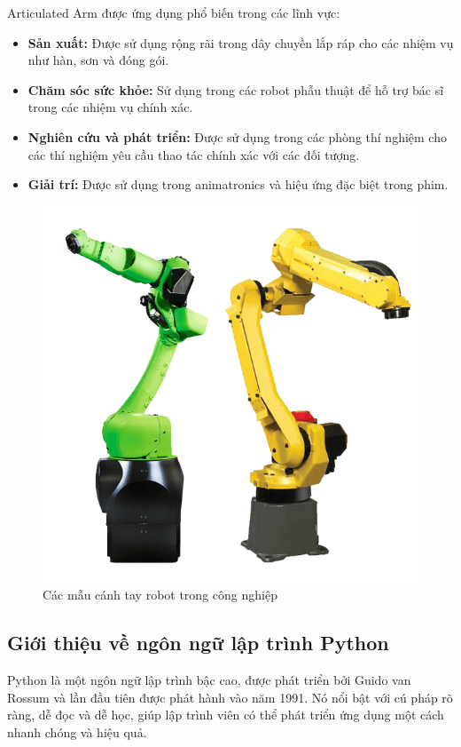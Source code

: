 Articulated Arm được ứng dụng phổ biến trong các lĩnh vực:
\begin{itemize}
    \item \textbf{Sản xuất:} Được sử dụng rộng rãi trong dây chuyền lắp ráp cho các nhiệm vụ như hàn, sơn và đóng gói.
    \item \textbf{Chăm sóc sức khỏe:} Sử dụng trong các robot phẫu thuật để hỗ trợ bác sĩ trong các nhiệm vụ chính xác.
    \item \textbf{Nghiên cứu và phát triển:} Được sử dụng trong các phòng thí nghiệm cho các thí nghiệm yêu cầu thao tác chính xác với các đối tượng.
    \item \textbf{Giải trí:} Được sử dụng trong animatronics và hiệu ứng đặc biệt trong phim.
\end{itemize}

\begin{figure}[H]
    \centering
    \includegraphics[width=0.75\linewidth]{Images/6-axis-duo.png}
    \caption{Các mẫu cánh tay robot trong công nghiệp}
    \label{fig:enter-label}
\end{figure}

\subsection{Giới thiệu về ngôn ngữ lập trình Python}
Python là một ngôn ngữ lập trình bậc cao, được phát triển bởi Guido van Rossum và lần đầu tiên được phát hành vào năm 1991. Nó nổi bật với cú pháp rõ ràng, dễ đọc và dễ học, giúp lập trình viên có thể phát triển ứng dụng một cách nhanh chóng và hiệu quả.

